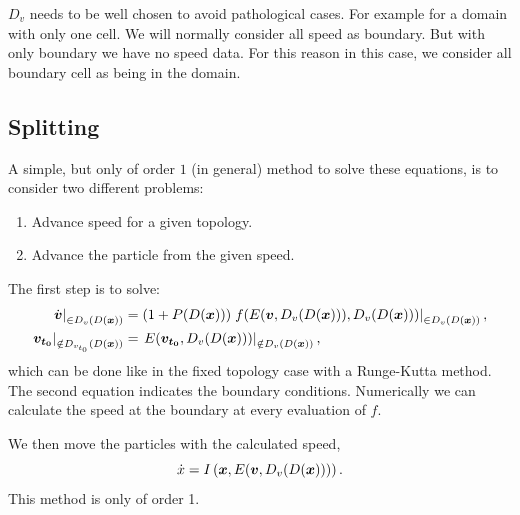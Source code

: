 \begin{remark}
$D_{v}$ needs to be well chosen to avoid pathological cases.
For example for a domain with only one cell. We will normally consider all speed as boundary. But with only boundary we have no speed data.
For this reason in this case, we consider all boundary cell as being in the domain.
\end{remark}


\subsection{Splitting}
\label{splitting}

A simple, but only of order $1$ (in general) method to solve these equations, is to consider two different problems:
\begin{enumerate}
	\item Advance speed for a given topology.
	\item Advance the particle from the given speed.
\end{enumerate}
The first step is to solve:
\begin{align}
\left.\dot{{\boldsymbol {v}}}\right|_{\in D_{v}(D({\boldsymbol {x}}))}&=\left(1+P(D({\boldsymbol {x}}))\right)\left.f(E({\boldsymbol {v}},D_v(D({\boldsymbol {x}}))),D_{v}(D({\boldsymbol {x}})))\right|_{\in D_{v}(D({\boldsymbol {x}}))},\\
	\left.{\boldsymbol {v_{t_0}}}\right|_{\notin D_{v_{t_0}}(D({\boldsymbol {x}}))}&=\left.E({\boldsymbol {v_{t_0}}},D_v(D({\boldsymbol {x}})))\right|_{\notin D_{v}(D({\boldsymbol {x}}))},
\end{align}
which can be done like in the fixed topology case with a Runge-Kutta method. The second equation indicates the boundary conditions.
Numerically we can calculate the speed at the boundary at every evaluation of $f$.

We then move the particles with the calculated speed,
\begin{equation}
	\dot{x}=I\left({\boldsymbol {x}},E({\boldsymbol {v}},D_v(D({\boldsymbol {x}})))\right).\\
\end{equation}
This method is only of order 1.

